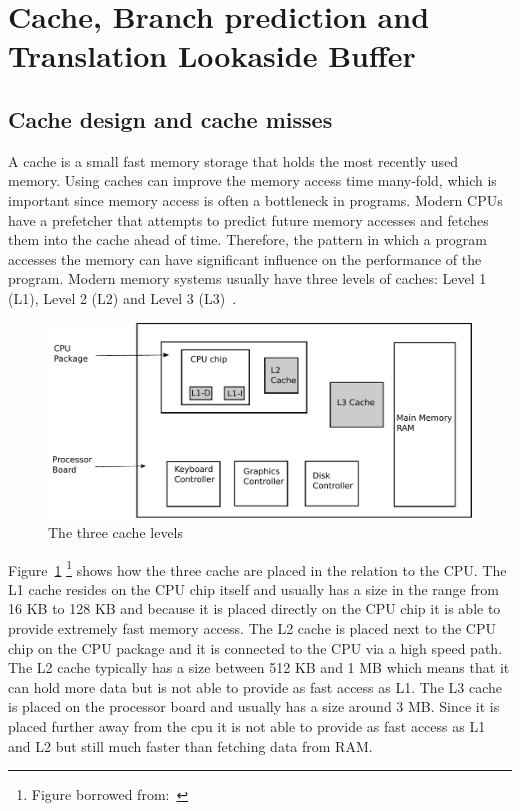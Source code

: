 \section{Cache, Branch prediction and Translation Lookaside Buffer}

\subsection{Cache design and cache misses}
A cache is a small fast memory storage that holds the most recently used memory.
Using caches can improve the memory access time many-fold, which is important since memory access is often a bottleneck in programs.
Modern CPUs have a prefetcher that attempts to predict future memory accesses and fetches them into the cache ahead of time.
Therefore, the pattern in which a program accesses the memory can have significant influence on the performance of the program.
Modern memory systems usually have three levels of caches: Level 1 (L1), Level 2 (L2) and Level 3 (L3)~\citep[Section~4.5.1]{Tanenbaum}.

\begin{figure}
\includegraphics[width=\textwidth]{CacheLevels.pdf}
\caption{The three cache levels}
\label{fig:CacheLevels}
\end{figure}

Figure~\ref{fig:CacheLevels} \footnote{Figure borrowed from:~\citep[Section~4.5.1]{Tanenbaum}} shows how the three cache are placed in the relation to the CPU. 
The L1 cache resides on the CPU chip itself and usually has a size in the range from 16 KB to 128 KB and because it is placed directly on the CPU chip it is able to provide extremely fast memory access.
The L2 cache is placed next to the CPU chip on the CPU package and it is connected to the CPU via a high speed path. The L2 cache typically has a size between 512 KB and 1 MB which means that it can hold more data but is not able to provide as fast access as L1.
The L3 cache is placed on the processor board and usually has a size around 3 MB. 
Since it is placed further away from the cpu it is not able to provide as fast access as L1 and L2 but still much faster than fetching data from RAM.

